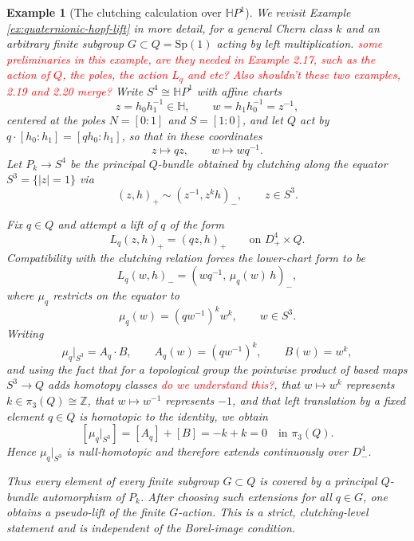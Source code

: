 \documentclass[11pt,a4paper]{article}
\numberwithin{equation}{section}
\newtheorem{example}[definition]{Example}
\theoremstyle{named}
\begin{document}
\begin{example}[The clutching calculation over $\mathbb{H}P^1$]
\label{ex:clutching-HP1}
We revisit Example \ref{ex:quaternionic-hopf-lift} in more detail, for a general Chern class $k$ and an arbitrary finite subgroup $G \subset Q = \mathrm{Sp}(1)$ acting by left multiplication. \textcolor{red}{some preliminaries in this example, are they needed in Example 2.17, such as the action of $Q$, the poles, the action $L_q$ and etc? Also shouldn't these two examples, 2.19 and 2.20 merge?} Write $S^4 \cong \mathbb{H}P^1$ with affine charts
\[
z = h_0 h_1^{-1} \in \mathbb{H}, \qquad w = h_1 h_0^{-1} = z^{-1},
\]
centered at the poles $N = [0:1]$ and $S = [1:0]$, and let $Q$ act by $q\cdot[h_0:h_1] = [qh_0:h_1]$, so that in these coordinates
\[
z \longmapsto qz, \qquad w \longmapsto wq^{-1}.
\]
Let $P_k \to S^4$ be the principal $Q$-bundle obtained by clutching along the equator $S^3 = \{|z|=1\}$ via
\[
(z,h)_+ \sim (z^{-1}, z^k h)_-, \qquad z \in S^3.
\]

Fix $q \in Q$ and attempt a lift of $q$ of the form
\[
L_q(z,h)_+ = (qz,h)_+ \qquad \text{on } D^4_+ \times Q.
\]
Compatibility with the clutching relation forces the lower-chart form to be
\[
L_q(w,h)_- = (wq^{-1},\, \mu_q(w)\,h)_-,
\]
where $\mu_q$ restricts on the equator to
\[
\mu_q(w) = (qw^{-1})^k w^k, \qquad w \in S^3.
\]
Writing
\[
\mu_q|_{S^3}=A_q\cdot B, \qquad A_q(w)=(qw^{-1})^k, \qquad B(w)=w^k,
\]
and using the fact that for a topological group the pointwise product of based maps \(S^3\to Q\) adds homotopy classes \textcolor{red}{do we understand this?}, that \(w\mapsto w^k\) represents \(k\in\pi_3(Q)\cong\mathbb Z\), that \(w\mapsto w^{-1}\) represents \(-1\), and that left translation by a fixed element \(q\in Q\) is homotopic to the identity, we obtain
\[
[\mu_q|_{S^3}] = [A_q]+[B] = -k+k = 0 \quad\text{in }\pi_3(Q).
\]
Hence \(\mu_q|_{S^3}\) is null-homotopic and therefore extends continuously over \(D^4_-\).

Thus every element of every finite subgroup \(G\subset Q\) is covered by a principal \(Q\)-bundle automorphism of \(P_k\). After choosing such extensions for all \(q\in G\), one obtains a pseudo-lift of the finite \(G\)-action. This is a strict, clutching-level statement and is independent of the Borel-image condition.


\end{example}
\end{document}
